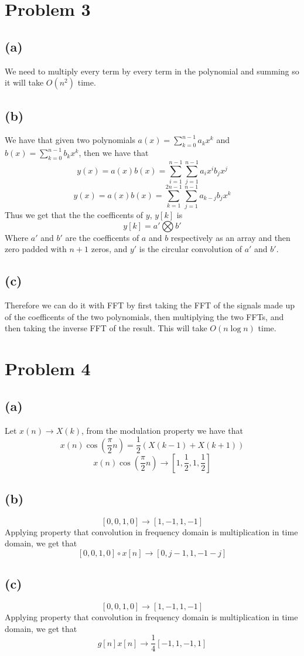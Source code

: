 \section*{Problem 3}
\subsection*{(a)}
We need to multiply every term by every term in the polynomial and summing 
so it will take $O(n^2)$ time.
\subsection*{(b)}
We have that given two polynomials $a(x)=\sum_{k=0}^{n-1}a_kx^k$ and
$b(x)=\sum_{k=0}^{n-1}b_kx^k$, then we have that
$$y(x)=a(x)b(x)=\sum_{i=1}^{n-1}\sum_{j=1}^{n-1}a_ix^ib_jx^j$$
$$y(x)=a(x)b(x)=\sum_{k=1}^{2n-1}\sum_{j=1}^{n-1}a_{k-j}b_jx^k$$
Thus we get that the the coefficents of $y$, $y[k]$ is 
$$y[k]=a'\bigotimes b'$$
Where $a'$ and $b'$ are the coefficents of $a$ and $b$ respectively
as an array and then zero padded with $n+1$ zeros, 
and $y'$ is the circular convolution of $a'$ and $b'$.
\subsection*{(c)}
Therefore we can do it with FFT by first taking the FFT
of the signals made up of the coefficents of the two polynomials, 
then multiplying the two FFTs, and then taking the inverse FFT of the
result. This will take $O(n\log n)$ time.
\section*{Problem 4}
\subsection*{(a)}
Let 
$x(n)\to X(k)$, 
from the modulation property we have that
$$x(n)\cos(\frac{\pi}{2}n)=\frac{1}{2}\left(X(k-1)+X(k+1)\right)$$
$$x(n)\cos(\frac{\pi}{2}n)\to [1,\frac{1}{2},1,\frac{1}{2}]$$
\subsection*{(b)}
$$[0,0,1,0]\to[1,-1,1,-1]$$
Applying property that convolution in frequency domain is multiplication in time domain, we get that
$$[0,0,1,0]\circ x[n]\to [0,j-1,1,-1-j]$$
\subsection*{(c)}
$$[0,0,1,0]\to[1,-1,1,-1]$$
Applying property that convolution in frequency domain is multiplication in time domain, we get that
$$g[n]x[n]\to \frac{1}{4}[-1,1,-1,1]$$
